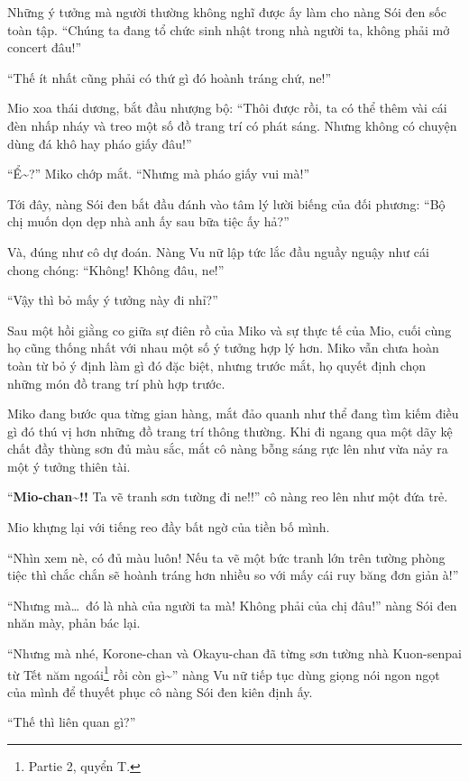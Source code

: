 \documentclass[../main.tex]{subfiles}
\begin{document}
Những ý tưởng mà người thường không nghĩ được ấy làm cho nàng Sói đen sốc toàn tập. ``Chúng ta đang tổ chức sinh nhật trong nhà người ta, không phải mở concert đâu!''

``Thế ít nhất cũng phải có thứ gì đó hoành tráng chứ, ne!''

Mio xoa thái dương, bắt đầu nhượng bộ: ``Thôi được rồi, ta có thể thêm vài cái đèn nhấp nháy và treo một số đồ trang trí có phát sáng. Nhưng không có chuyện dùng đá khô hay pháo giấy đâu!''

``Ể\~{}?'' Miko chớp mắt. ``Nhưng mà pháo giấy vui mà!''

Tới đây, nàng Sói đen bắt đầu đánh vào tâm lý lười biếng của đối phương: ``Bộ chị muốn dọn dẹp nhà anh ấy sau bữa tiệc ấy hả?''

Và, đúng như cô dự đoán. Nàng Vu nữ lập tức lắc đầu nguầy nguậy như cái chong chóng: ``Không! Không đâu, ne!''

``Vậy thì bỏ mấy ý tưởng này đi nhỉ?''

Sau một hồi giằng co giữa sự điên rồ của Miko và sự thực tế của Mio, cuối cùng họ cũng thống nhất với nhau một số ý tưởng hợp lý hơn. Miko vẫn chưa hoàn toàn từ bỏ ý định làm gì đó đặc biệt, nhưng trước mắt, họ quyết định chọn những món đồ trang trí phù hợp trước.

\ct

Miko đang bước qua từng gian hàng, mắt đảo quanh như thể đang tìm kiếm điều gì đó thú vị hơn những đồ trang trí thông thường. Khi đi ngang qua một dãy kệ chất đầy thùng sơn đủ màu sắc, mắt cô nàng bỗng sáng rực lên như vừa nảy ra một ý tưởng thiên tài.

``\textbf{Mio-chan\~{}!!} Ta vẽ tranh sơn tường đi ne!!'' cô nàng reo lên như một đứa trẻ.

Mio khựng lại với tiếng reo đầy bất ngờ của tiền bố mình.

``Nhìn xem nè, có đủ màu luôn! Nếu ta vẽ một bức tranh lớn trên tường phòng tiệc thì chắc chắn sẽ hoành tráng hơn nhiều so với mấy cái ruy băng đơn giản à!''

``Nhưng mà\dots\ đó là nhà của người ta mà! Không phải của chị đâu!'' nàng Sói đen nhăn mày, phản bác lại.

``Nhưng mà nhé, Korone-chan và Okayu-chan đã từng sơn tường nhà Kuon-senpai từ Tết năm ngoái\footnote{{\sen Partie 2}, quyển T.} rồi còn gì\~{}'' nàng Vu nữ tiếp tục dùng giọng nói ngon ngọt của mình để thuyết phục cô nàng Sói đen kiên định ấy.

``Thế thì liên quan gì?''
\end{document}
